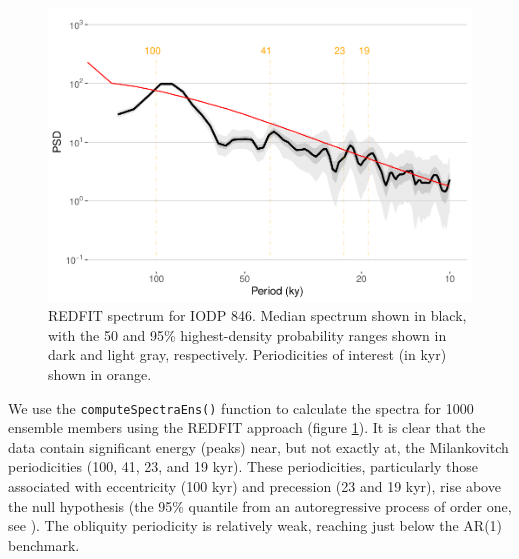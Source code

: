 \documentclass[gchron, manuscript]{copernicus}
\begin{document}
\begin{figure}
\includegraphics[width=12cm]{geoChronR-paper_files/figure-latex/redfit-plot-1} \caption{REDFIT spectrum for IODP 846. Median spectrum shown in black, with the 50 and 95\% highest-density probability ranges shown in dark and light gray, respectively. Periodicities of interest (in kyr) shown in orange.}\label{fig:redfit-plot}
\end{figure}

We use the \texttt{computeSpectraEns()} function to calculate the spectra for 1000 ensemble members using the REDFIT approach (figure \ref{fig:redfit-plot}). It is clear that the data contain significant energy (peaks) near, but not exactly at, the Milankovitch periodicities (100, 41, 23, and 19 kyr). These periodicities, particularly those associated with eccentricity (100 kyr) and precession (23 and 19 kyr), rise above the null hypothesis (the 95\% quantile from an autoregressive process of order one, see \citet{Mudelsee_NPG09}).
The obliquity periodicity is relatively weak, reaching just below the AR(1) benchmark.
\end{document}
